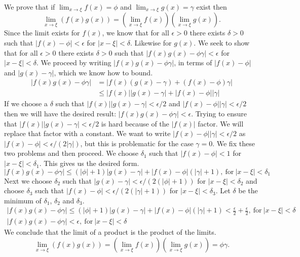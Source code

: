 \begin{Example}
  We prove that if $\lim_{x \to \xi} f(x) = \phi$ and $\lim_{x \to \xi} g(x) = \gamma$ 
  exist then
  \[
  \lim_{x \to \xi} \left( f(x) g(x) \right)
  = \left(\lim_{x \to \xi} f(x) \right) \left( \lim_{x \to \xi} g(x) \right).
  \]
  Since the limit exists for $f(x)$, we know that for all $\epsilon > 0$ there 
  exists $\delta > 0$ such that $|f(x) - \phi| < \epsilon$ for $|x - \xi| < \delta$.  Likewise
  for $g(x)$.
  We seek to show that for all $\epsilon > 0$ there exists $\delta > 0$ such that
  $|f(x) g(x) - \phi \gamma| < \epsilon$ for $|x - \xi| < \delta$.  We proceed by writing
  $|f(x) g(x) - \phi \gamma|$, in terms of $|f(x) - \phi|$ and $|g(x) - \gamma|$, which
  we know how to bound.
  \begin{align*}
    | f(x) g(x) - \phi \gamma | 
    &= | f(x) (g(x) - \gamma) + (f(x) - \phi) \gamma | \\
    &\leq | f(x) | | g(x) - \gamma | + | f(x) - \phi | | \gamma |
  \end{align*}
  If we choose a $\delta$ such that $| f(x) | | g(x) - \gamma | < \epsilon / 2$ and 
  $| f(x) - \phi | | \gamma | < \epsilon / 2$ then we will have the desired 
  result: $| f(x) g(x) - \phi \gamma | < \epsilon$.
  Trying to ensure that $| f(x) | | g(x) - \gamma | < \epsilon / 2$ is hard because
  of the $|f(x)|$ factor.  We will replace that factor with a constant.
  We want to write $| f(x) - \phi | | \gamma | < \epsilon / 2$ as $| f(x) - \phi | < \epsilon / (2 |\gamma|)$,
  but this is problematic for the case $\gamma = 0$.  We fix these two problems
  and then proceed.  We choose $\delta_1$ such that $|f(x) - \phi| < 1$ for 
  $|x - \xi| < \delta_1$.  This gives us the desired form.
  \[
  | f(x) g(x) - \phi \gamma | 
  \leq (|\phi| + 1) | g(x) - \gamma | + | f(x) - \phi | (| \gamma | + 1),\ 
  \mathrm{for}\ |x - \xi| < \delta_1
  \]
  Next we choose $\delta_2$ such that $|g(x) - \gamma| < \epsilon / (2 (|\phi| + 1))$ for
  $|x - \xi| < \delta_2$ and choose $\delta_3$ such that $|f(x) - \phi| < \epsilon / (2 (|\gamma| + 1))$ 
  for $|x - \xi| < \delta_3$.
  Let $\delta$ be the minimum of $\delta_1$, $\delta_2$ and $\delta_3$.
  \begin{gather*}
    | f(x) g(x) - \phi \gamma | 
    \leq (|\phi| + 1) | g(x) - \gamma | + | f(x) - \phi | (| \gamma | + 1)
    < \frac{\epsilon}{2} + \frac{\epsilon}{2},\ 
    \mathrm{for}\ |x - \xi| < \delta
    \\
    | f(x) g(x) - \phi \gamma | < \epsilon,\ \mathrm{for}\ |x - \xi| < \delta
  \end{gather*}
  We conclude that the limit of a product is the product of the limits.
  \[
  \lim_{x \to \xi} \left( f(x) g(x) \right)
  = \left(\lim_{x \to \xi} f(x) \right) \left( \lim_{x \to \xi} g(x) \right)
  = \phi \gamma.
  \]
\end{Example}



